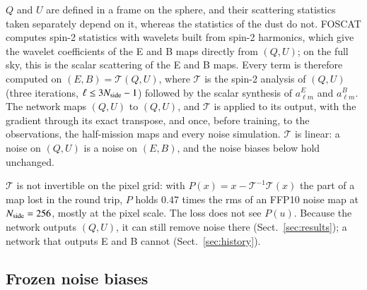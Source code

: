\documentclass{aa}
\newcommand{\nside}{N_{\rm side}}
\begin{document}
$Q$ and $U$ are defined in a frame on the sphere, and their scattering statistics taken separately depend on it, whereas the statistics of the dust do not. FOSCAT \citep{foscat} computes spin-2 statistics with wavelets built from spin-2 harmonics, which give the wavelet coefficients of the E and B maps directly from $(Q,U)$; on the full sky, this is the scalar scattering of the E and B maps. Every term is therefore computed on $(E,B)=\mathcal{T}(Q,U)$, where $\mathcal{T}$ is the spin-2 analysis of $(Q,U)$ (three iterations, $\ell\le3\nside-1$) followed by the scalar synthesis of $a^E_{\ell m}$ and $a^B_{\ell m}$. The network maps $(Q,U)$ to $(Q,U)$, and $\mathcal{T}$ is applied to its output, with the gradient through its exact transpose, and once, before training, to the observations, the half-mission maps and every noise simulation. $\mathcal{T}$ is linear: a noise on $(Q,U)$ is a noise on $(E,B)$, and the noise biases below hold unchanged.

$\mathcal{T}$ is not invertible on the pixel grid: with $P(x)=x-\mathcal{T}^{-1}\mathcal{T}(x)$ the part of a map lost in the round trip, $P$ holds 0.47 times the rms of an FFP10 noise map at $\nside=256$, mostly at the pixel scale. The loss does not see $P(u)$. Because the network outputs $(Q,U)$, it can still remove noise there (Sect.~\ref{sec:results}); a network that outputs E and B cannot (Sect.~\ref{sec:history}).

\subsection{Frozen noise biases}\label{sec:variants}
\end{document}

